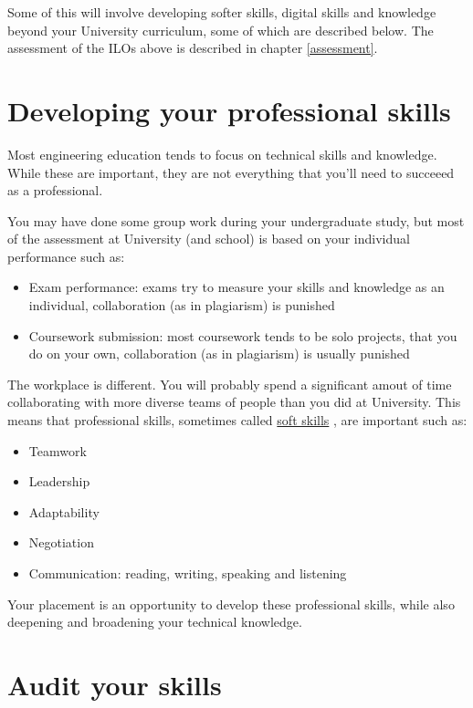 \documentclass[
]{book}
\providecommand{\tightlist}{%
  \setlength{\itemsep}{0pt}\setlength{\parskip}{0pt}}
\begin{document}
Some of this will involve developing softer skills, digital skills and knowledge beyond your University curriculum, some of which are described below. The assessment of the ILOs above is described in chapter \ref{assessment}.

\section{Developing your professional skills}\label{soft}

Most engineering education tends to focus on technical skills and knowledge. While these are important, they are not everything that you'll need to succeeed as a professional.

You may have done some group work during your undergraduate study, but most of the assessment at University (and school) is based on your individual performance such as:

\begin{itemize}
\tightlist
\item
  Exam performance: exams try to measure your skills and knowledge as an individual, collaboration (as in plagiarism) is punished
\item
  Coursework submission: most coursework tends to be solo projects, that you do on your own, collaboration (as in plagiarism) is usually punished
\end{itemize}

The workplace is different. You will probably spend a significant amout of time collaborating with more diverse teams of people than you did at University. This means that professional skills, sometimes called \href{https://en.wikipedia.org/wiki/Soft_skills}{soft skills} \citep{soft, transferable, professionalism}, are important such as:

\begin{itemize}
\tightlist
\item
  Teamwork
\item
  Leadership
\item
  Adaptability
\item
  Negotiation
\item
  Communication: reading, writing, speaking and listening
\end{itemize}

Your placement is an opportunity to develop these professional skills, while also deepening and broadening your technical knowledge.

\section{Audit your skills}\label{Audit}
\end{document}
